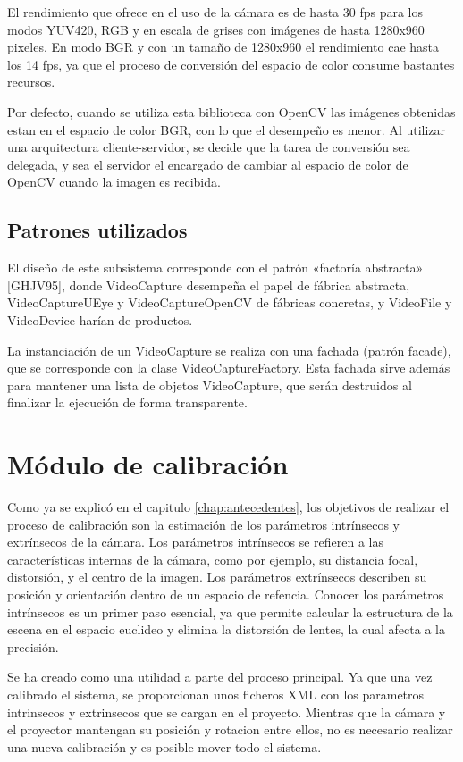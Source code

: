 El rendimiento que ofrece en el uso de la cámara es de hasta 30 fps para los modos YUV420, RGB y en escala de grises con imágenes de hasta 1280x960 pixeles. En modo BGR y con un tamaño de 1280x960 el rendimiento cae hasta los 14 fps, ya que el proceso de conversión del espacio de color consume bastantes recursos. 

Por defecto, cuando se utiliza esta biblioteca con OpenCV las imágenes obtenidas estan en el espacio de color BGR, con lo que el desempeño es menor. Al utilizar una arquitectura cliente-servidor, se decide que la tarea de conversión sea delegada, y sea el servidor el encargado de cambiar al espacio de color de OpenCV cuando la imagen es recibida.

\subsection{Patrones utilizados}
El diseño de este subsistema corresponde con el patrón «factoría abstracta» [GHJV95], donde VideoCapture desempeña el papel de fábrica abstracta, VideoCaptureUEye y VideoCaptureOpenCV de fábricas concretas, y VideoFile y VideoDevice harían de productos.


La instanciación de un VideoCapture se realiza con una fachada (patrón facade), que se corresponde con la clase VideoCaptureFactory. Esta fachada sirve además para mantener una lista de objetos VideoCapture, que serán destruidos al finalizar la ejecución de forma transparente.


\section{Módulo de calibración}
Como ya se explicó en el capitulo \ref{chap:antecedentes}, los objetivos de realizar el proceso de calibración son la estimación de los parámetros intrínsecos y extrínsecos de la cámara. Los parámetros intrínsecos se refieren a las características internas de la cámara, como por ejemplo, su distancia focal, distorsión, y el centro de la imagen. Los parámetros extrínsecos describen su posición y orientación dentro de un espacio de refencia. Conocer los parámetros intrínsecos es un primer paso esencial, ya que permite calcular la estructura de la escena en el espacio euclideo y elimina la distorsión de lentes, la cual afecta a la precisión.

Se ha creado como una utilidad a parte del proceso principal. Ya que una vez calibrado el sistema, se proporcionan unos ficheros XML con los parametros intrinsecos y extrinsecos que se cargan en el proyecto. Mientras que la cámara y el proyector mantengan su posición y rotacion entre ellos, no es necesario realizar una nueva calibración y es posible mover todo el sistema.

